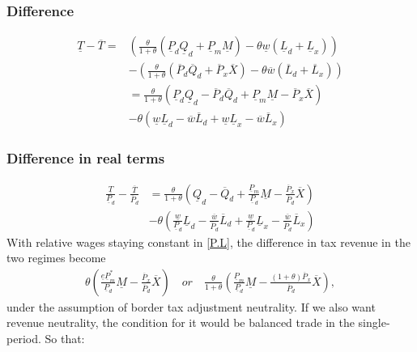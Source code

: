 \subsubsection*{Difference} 
\begin{equation}\label{t.diff}
\begin{aligned}
\underline T - \overline T = & \left( \frac{\theta}{1+\theta} \left(  \underline P_d \underline Q_d + \underline P_m \underline M \right )  - \theta \underline w  \left( \underline L_d + \underline L_x \right)  \right) \\ &-  \left( \frac{\theta}{1+\theta} \left( \overline P_d \overline Q_d  + \overline P_x \overline X  \right)  - \theta \overline w  \left( \overline L_d + \overline L_x \right)  \right)  \\
&= \frac{\theta}{1+\theta} \left( \underline P_d \underline Q_d - \overline P_d  \overline Q_d + \underline P_m \underline M - \overline P_x \overline X \right) \\ &- \theta \left( \underline w \underline L_d - \overline w \overline L_d + \underline w \underline L_x - \overline w \overline L_x \right) 
\end{aligned} 
\end{equation}

\subsubsection*{Difference in real terms}

\begin{equation}\label{t.real}
\begin{aligned}
    \frac{\underline T}{\underline P_d} - \frac{\overline T}{\overline P_d} &=  \frac{\theta}{1+\theta}  \left(  \underline Q_d - \overline Q_d +\frac{\underline P_m}{\underline P_d}\underline M - \frac{\overline P_x}{\overline P_d} \overline X \right) \\ &- \theta \left( \frac {\underline w}{\underline P_d} \underline L_d - \frac {\overline w}{\overline P_d} \overline L_d + \frac {\underline w}{\underline P_d} \underline L_x - \frac {\overline w}{\overline P_d} \overline L_x \right)
\end{aligned} 
\end{equation}
With relative wages staying constant in \eqref{P.L}, the difference in tax revenue in the two regimes become
\begin{equation}\label{t.real2}
\begin{aligned}    
    \theta  \left( \frac{\underline e \underline P^*_m}{\underline P_d} \underline M - \frac{\overline P_x}{\overline P_d}\overline X \right) \quad or \quad \frac{\theta}{1+\theta}  \left( \frac{\underline P_m}{\underline P_d} \underline M - \frac{ \left( 1+\theta \right) \overline P_x}{\overline P_d}\overline X \right),
\end{aligned} 
\end{equation}
under the assumption of border tax adjustment neutrality. 
If we also want revenue neutrality, the condition for it would be balanced trade in the single-period. So that:


